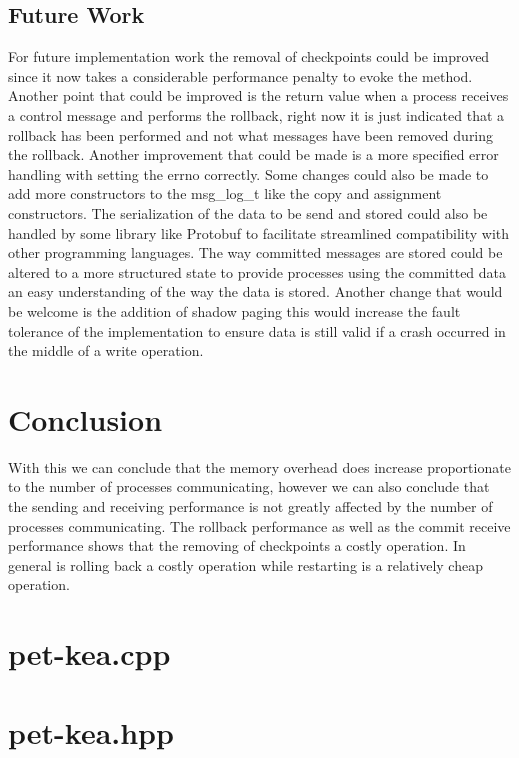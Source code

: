 \documentclass[twocolumn, a4paper,11pt]{article}%
\begin{document}
\subsection{Future Work}
\par For future implementation work the removal of checkpoints could be improved since it now takes a considerable performance penalty to evoke the method. Another point that could be improved is the return value when a process receives a control message and performs the rollback, right now it is just indicated that a rollback has been performed and not what messages have been removed  during the rollback. Another improvement that could be made is a more specified error handling with setting the errno correctly. Some changes could also be made to add more constructors to the msg\_log\_t like the copy and assignment constructors. The serialization of the data to be send and stored could also be handled by some library like Protobuf\cite{protobuf} to facilitate streamlined compatibility with other programming languages. The way committed messages are stored could be altered to a more structured state to provide processes using the committed data an easy understanding of the way the data is stored. Another change that would be welcome is the addition of  shadow paging this would increase the fault tolerance of the implementation  to ensure data is still valid if a crash occurred in the middle of a write operation.


\section{Conclusion}
With this we can conclude that the memory overhead does increase proportionate to the number of processes communicating, however we can also conclude that the sending and receiving performance is not greatly affected by the number of processes communicating. The rollback performance as well as the commit receive performance shows that the removing of checkpoints a costly operation. In general is rolling back a costly operation while restarting is a relatively cheap operation.
\newpage
\onecolumn

\appendix

\section{pet-kea.cpp}



\section{pet-kea.hpp}






\end{document}
